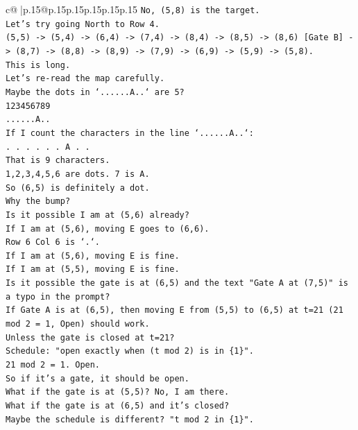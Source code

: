\documentclass{article}
\begin{document}
{\begin{supertabular}{c@{$\;$}|p{.15\linewidth}@{}p{.15\linewidth}p{.15\linewidth}p{.15\linewidth}p{.15\linewidth}p{.15\linewidth}}
{{{\texttt{No, (5,8) is the target.} \\
\texttt{Let's try going North to Row 4.} \\
\texttt{(5,5) {-}> (5,4) {-}> (6,4) {-}> (7,4) {-}> (8,4) {-}> (8,5) {-}> (8,6) {[}Gate B{]} {-}> (8,7) {-}> (8,8) {-}> (8,9) {-}> (7,9) {-}> (6,9) {-}> (5,9) {-}> (5,8).} \\
\texttt{This is long.} \\
\texttt{Let's re{-}read the map carefully.} \\
\texttt{Maybe the dots in `......A..` are 5?} \\
\texttt{123456789} \\
\texttt{......A..} \\
\texttt{If I count the characters in the line `......A..`:} \\
\texttt{. . . . . . A . .} \\
\texttt{That is 9 characters.} \\
\texttt{1,2,3,4,5,6 are dots. 7 is A.} \\
\texttt{So (6,5) is definitely a dot.} \\
\texttt{Why the bump?} \\
\texttt{Is it possible I am at (5,6) already?} \\
\texttt{If I am at (5,6), moving E goes to (6,6).} \\
\texttt{Row 6 Col 6 is `.`.} \\
\texttt{If I am at (5,6), moving E is fine.} \\
\texttt{If I am at (5,5), moving E is fine.} \\
\texttt{Is it possible the gate is at (6,5) and the text "Gate A at (7,5)" is a typo in the prompt?} \\
\texttt{If Gate A is at (6,5), then moving E from (5,5) to (6,5) at t=21 (21 mod 2 = 1, Open) should work.} \\
\texttt{Unless the gate is closed at t=21?} \\
\texttt{Schedule: "open exactly when (t mod 2) is in \{1\}".} \\
\texttt{21 mod 2 = 1. Open.} \\
\texttt{So if it's a gate, it should be open.} \\
\texttt{What if the gate is at (5,5)? No, I am there.} \\
\texttt{What if the gate is at (6,5) and it's closed?} \\
\texttt{Maybe the schedule is different? "t mod 2 in \{1\}".} \\
}}}
\end{supertabular}}
\end{document}
